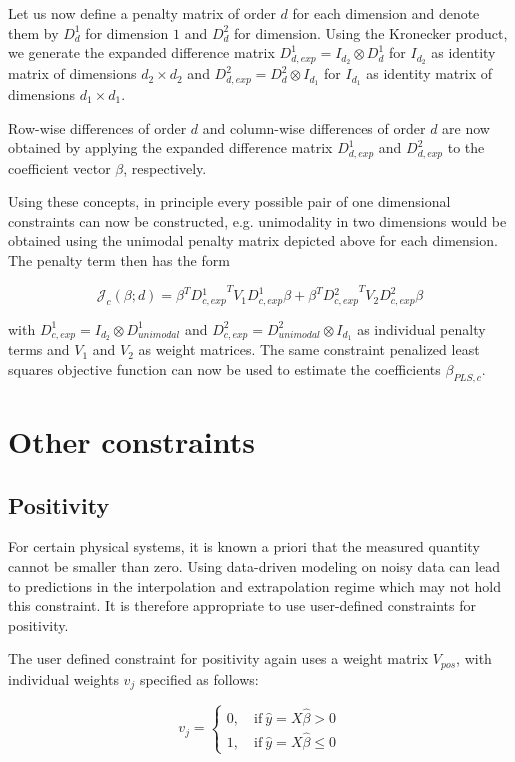 \documentclass[10pt,a4paper]{article}
\begin{document}
	Let us now define a penalty matrix of order $d$ for each dimension and denote them by $D^1_d$ for dimension $1$ and $D^2_d$ for dimension. Using the Kronecker product, we generate the expanded difference matrix $D_{d, exp}^1 = I_{d_2} \otimes D^1_d$ for $I_{d_2}$ as identity matrix of dimensions $d_2 \times d_2$ and $D_{d,exp}^2 = D^2_d \otimes I_{d_1}$ for $I_{d_1}$ as identity matrix of dimensions $d_1 \times d_1$. 
	
	Row-wise differences of order $d$ and column-wise differences of order $d$ are now obtained by applying the expanded difference matrix $D_{d,exp}^1$ and $D_{d,exp}^2$ to the coefficient vector $\beta$, respectively. 
	
	Using these concepts, in principle every possible pair of one dimensional constraints can now be constructed, e.g. unimodality in two dimensions would be obtained using the unimodal penalty matrix depicted above for each dimension. The penalty term then has the form
	
	$$\mathcal J_c(\beta; d) = \beta^T D{^1_{c,exp}}^T V_1 D_{c,exp}^1 \beta + \beta^T D{^2_{c,exp}}^T V_2 D_{c,exp}^2 \beta$$
	
	with $D_{c,exp}^1 = I_{d_2} \otimes D_{unimodal}^1$ and $D_{c,exp}^2 = D_{unimodal}^2 \otimes I_{d_1}$ as individual penalty terms and $V_1$ and $V_2$ as weight matrices. The same constraint penalized least squares objective function can now be used to estimate the coefficients $\beta_{PLS,c}$.
	
	\section{Other constraints}
	
	\subsection{Positivity}
	
	For certain physical systems, it is known a priori that the measured quantity cannot be smaller than zero. Using data-driven modeling on noisy data can lead to predictions in the interpolation and extrapolation regime which may not hold this constraint. It is therefore appropriate to use user-defined constraints for positivity.
	
	The user defined constraint for positivity again uses a weight matrix $V_{pos}$, with individual weights $v_j$ specified as follows:
	
	$$v_j = \begin{cases} 0, \quad \text{if} \ \hat y = X\hat \beta > 0\\ 1, \quad \text{if} \ \hat y = X \hat \beta \le 0 \end{cases}$$
	
\end{document}
